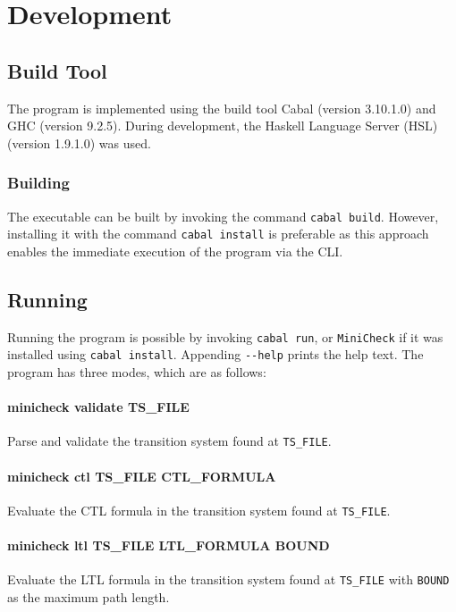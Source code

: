\documentclass[11pt]{article}
\begin{document}
\section{Development}

\subsection{Build Tool}

The program is implemented using the build tool Cabal (version 3.10.1.0) and GHC (version 9.2.5).
During development, the Haskell Language Server (HSL) (version 1.9.1.0) was used.

\subsubsection{Building}
The executable can be built by invoking the command \verb|cabal build|.
However, installing it with the command \verb|cabal install| is preferable as this approach enables the immediate execution of the program via the CLI.

\subsection{Running}
\label{subsec:dev:running}

Running the program is possible by invoking \verb|cabal run|, or \verb|MiniCheck| if it was installed using \verb|cabal install|.
Appending \verb|--help| prints the help text.
The program has three modes, which are as follows:

\paragraph{minicheck validate TS\_FILE}
Parse and validate the transition system found at \verb|TS_FILE|.

\paragraph{minicheck ctl TS\_FILE CTL\_FORMULA}
Evaluate the CTL formula in the transition system found at \verb|TS_FILE|.

\paragraph{minicheck ltl TS\_FILE LTL\_FORMULA BOUND}
Evaluate the LTL formula in the transition system found at \verb|TS_FILE| with \verb|BOUND| as the maximum path length.
\end{document}
